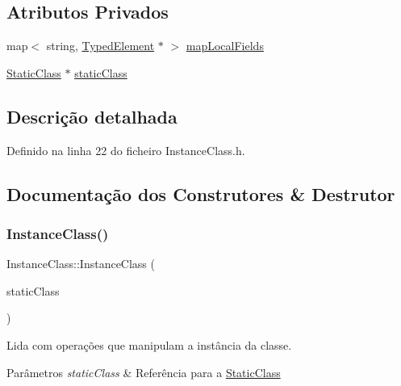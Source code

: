 \subsection*{Atributos Privados}
\begin{DoxyCompactItemize}
\item 
map$<$ string, \hyperlink{BasicTypes_8h_a97b332303b1262282599e6ede0637b82}{Typed\+Element} $\ast$ $>$ \hyperlink{classInstanceClass_a455e05eefc1273e6cf22607c8941e9c0}{map\+Local\+Fields}
\item 
\hyperlink{classStaticClass}{Static\+Class} $\ast$ \hyperlink{classInstanceClass_a45804f1afe3666a4b4511cf8e3f1013b}{static\+Class}
\end{DoxyCompactItemize}


\subsection{Descrição detalhada}


Definido na linha 22 do ficheiro Instance\+Class.\+h.



\subsection{Documentação dos Construtores \& Destrutor}
\mbox{\label{classInstanceClass_ac1bee1eb9725e1fec8de7f4cf97f369c}} 
\subsubsection{\texorpdfstring{Instance\+Class()}{InstanceClass()}}
{\footnotesize\ttfamily Instance\+Class\+::\+Instance\+Class (\begin{DoxyParamCaption}\item[{\hyperlink{classStaticClass}{Static\+Class} $\ast$}]{static\+Class }\end{DoxyParamCaption})}



Lida com operações que manipulam a instância da classe. 


\begin{DoxyParams}{Parâmetros}
{\em static\+Class} & Referência para a \hyperlink{classStaticClass}{Static\+Class} \\
\hline
\end{DoxyParams}



